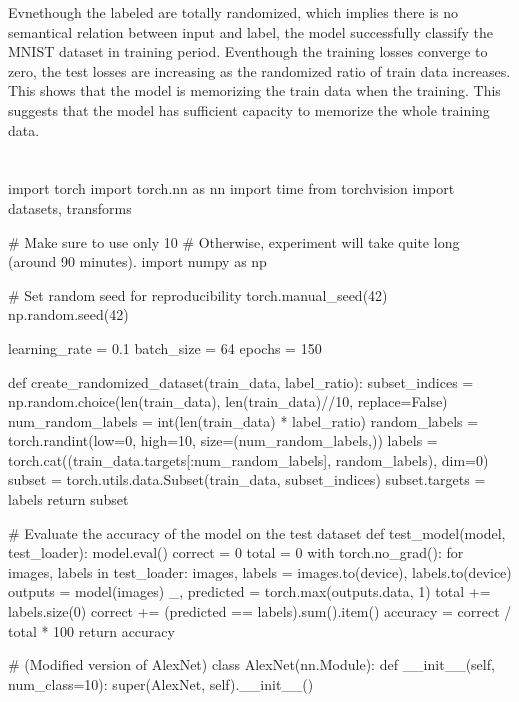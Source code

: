 \documentclass[10pt]{article}
\begin{document}
Evnethough the labeled are totally randomized, which implies there is no semantical relation between input and label, the model successfully classify the MNIST dataset in training period.
Eventhough the training losses converge to zero, the test losses are increasing as the randomized ratio of train data increases.
This shows that the model is memorizing the train data when the training. This suggests that the model has sufficient capacity to memorize the whole training data.



\clearpage
\appendix
\section{}
\begin{python}
    import torch
    import torch.nn as nn
    import time
    from torchvision import datasets, transforms
    
    # Make sure to use only 10%
    # Otherwise, experiment will take quite long (around 90 minutes).
    import numpy as np
    
    # Set random seed for reproducibility
    torch.manual_seed(42)
    np.random.seed(42)
    
    learning_rate = 0.1
    batch_size = 64
    epochs = 150
    
    def create_randomized_dataset(train_data, label_ratio):
        subset_indices = np.random.choice(len(train_data), len(train_data)//10, replace=False)
        num_random_labels = int(len(train_data) * label_ratio)
        random_labels = torch.randint(low=0, high=10, size=(num_random_labels,))
        labels = torch.cat((train_data.targets[:num_random_labels], random_labels), dim=0)
        subset = torch.utils.data.Subset(train_data, subset_indices)
        subset.targets = labels
        return subset
    
    # Evaluate the accuracy of the model on the test dataset
    def test_model(model, test_loader):
        model.eval()
        correct = 0
        total = 0
        with torch.no_grad():
            for images, labels in test_loader:
                images, labels = images.to(device), labels.to(device)
                outputs = model(images)
                _, predicted = torch.max(outputs.data, 1)
                total += labels.size(0)
                correct += (predicted == labels).sum().item()
        accuracy = correct / total * 100
        return accuracy
    
    # (Modified version of AlexNet)
    class AlexNet(nn.Module):
        def __init__(self, num_class=10):
            super(AlexNet, self).__init__()
    

\end{python}
\end{document}
